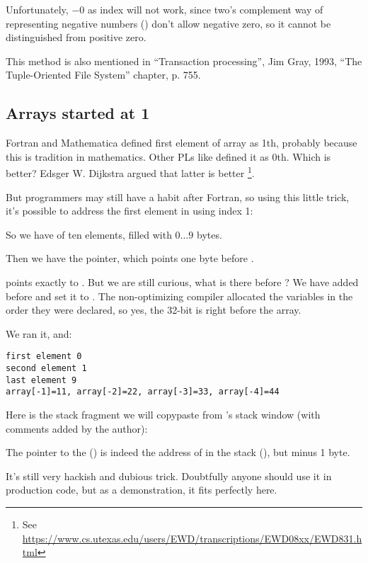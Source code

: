 Unfortunately, $-0$ as index will not work,
since two's complement way of representing negative numbers () don't allow negative zero,
so it cannot be distinguished from positive zero.

This method is also mentioned in ``Transaction processing'', Jim Gray, 1993,
``The Tuple-Oriented File System'' chapter, p. 755.

\subsection{Arrays started at 1}

Fortran and Mathematica defined first element of array as 1th, probably because this is tradition in mathematics.
Other \ac{PL}s like \CCpp defined it as 0th.
Which is better?
Edsger W. Dijkstra argued that latter is better
\footnote{See \url{https://www.cs.utexas.edu/users/EWD/transcriptions/EWD08xx/EWD831.html}}.

But programmers may still have a habit after Fortran, so using this little trick, it's possible to address the first element
in \CCpp using index 1:





So we have  of ten elements, filled with $0 \ldots 9$ bytes.

Then we have the  pointer, which points one byte before .

 points exactly to .
But we are still curious, what is there before ?
We have added  before  and set 
it to .
The non-optimizing compiler allocated the variables in the order they were declared, so yes, the 32-bit 
is right before the array.

We ran it, and:

\begin{lstlisting}
first element 0
second element 1
last element 9
array[-1]=11, array[-2]=22, array[-3]=33, array[-4]=44
\end{lstlisting}

Here is the stack fragment we will copypaste from \olly's stack window (with comments added by the author):



The pointer to the  () is indeed 
the address of  in the stack (), 
but minus 1 byte.

It's still very hackish and dubious trick. Doubtfully anyone should use it in production code,
but as a demonstration, it fits perfectly here.



